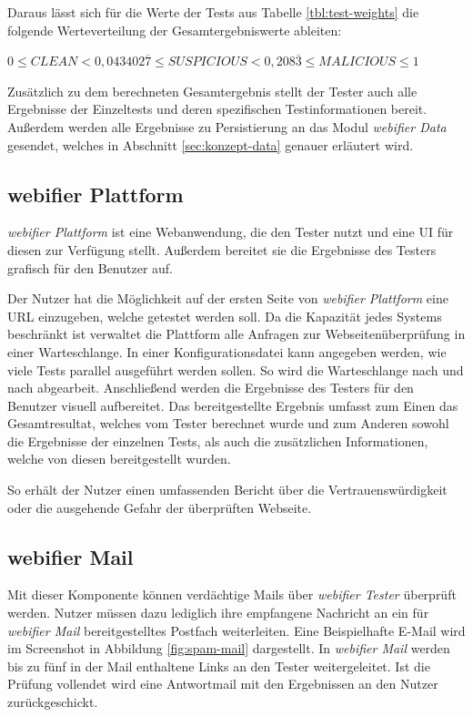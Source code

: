 Daraus lässt sich für die Werte der Tests aus Tabelle \ref{tbl:test-weights} die folgende Werteverteilung der Gesamtergebniswerte ableiten:

\begin{center}
$0 \leq CLEAN < 0,043402\overline{7} \leq SUSPICIOUS < 0,208\overline{3} \leq MALICIOUS \leq 1$
\end{center}

Zusätzlich zu dem berechneten Gesamtergebnis stellt der Tester auch alle Ergebnisse der Einzeltests
und deren spezifischen Testinformationen bereit. Außerdem werden alle Ergebnisse zu Persistierung an
das Modul \textit{webifier Data} gesendet, welches in Abschnitt \ref{sec:konzept-data} genauer erläutert wird.

\subsection{webifier Plattform}

\textit{webifier Plattform} ist eine Webanwendung, die den Tester nutzt und eine \ac{UI} für diesen
zur Verfügung stellt. Außerdem bereitet sie die Ergebnisse des Testers grafisch für den Benutzer auf.

Der Nutzer hat die Möglichkeit auf der ersten Seite von \textit{webifier Plattform} eine \acs{URL}
einzugeben, welche getestet werden soll. Da die Kapazität jedes Systems beschränkt ist verwaltet die
Plattform alle Anfragen zur Webseitenüberprüfung in einer Warteschlange. In einer
Konfigurationsdatei kann angegeben werden, wie viele Tests parallel ausgeführt werden sollen. So
wird die Warteschlange nach und nach abgearbeit. Anschließend werden die Ergebnisse des Testers für
den Benutzer visuell aufbereitet. Das bereitgestellte Ergebnis umfasst zum Einen das Gesamtresultat, welches vom Tester berechnet wurde und zum Anderen sowohl die Ergebnisse der einzelnen Tests, als auch die zusätzlichen Informationen, welche von diesen bereitgestellt wurden.

So erhält der Nutzer einen umfassenden Bericht über die Vertrauenswürdigkeit oder die ausgehende Gefahr der überprüften Webseite.

\subsection{webifier Mail}
Mit dieser Komponente können verdächtige Mails über \textit{webifier Tester} überprüft werden.
Nutzer müssen dazu lediglich ihre empfangene Nachricht an ein für \textit{webifier Mail}
bereitgestelltes Postfach weiterleiten. Eine Beispielhafte E-Mail wird im Screenshot in
Abbildung \ref{fig:spam-mail} dargestellt. In \textit{webifier Mail} werden bis zu fünf in der
Mail enthaltene Links an den Tester weitergeleitet. Ist die Prüfung vollendet wird eine Antwortmail
mit den Ergebnissen an den Nutzer zurückgeschickt.


